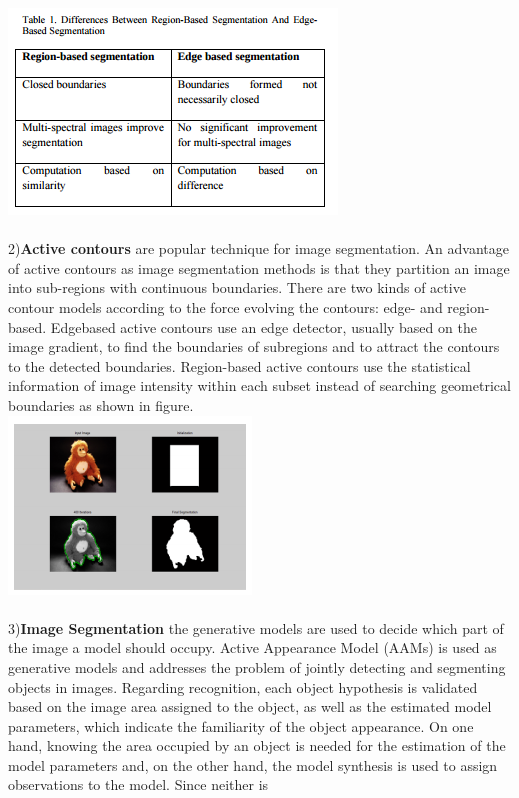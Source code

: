 \documentclass{article}
\begin{document}
\includegraphics[scale=.5]{2}\\\\
2)\textbf{Active contours} are popular technique for image
segmentation. An advantage of active contours as image
segmentation methods is that they partition an image into
sub-regions with continuous boundaries. There are two
kinds of active contour models according to the force
evolving the contours: edge- and region-based. Edgebased
active contours use an edge detector, usually based
on the image gradient, to find the boundaries of subregions
and to attract the contours to the detected
boundaries. Region-based active contours use the
statistical information of image intensity within each
subset instead of searching geometrical boundaries as
shown in figure. \\
\includegraphics[scale=.5]{3}\\\\
3)\textbf{Image Segmentation} the generative models are used
to decide which part of the image a model should occupy.
Active Appearance Model (AAMs) is used as generative
models and addresses the problem of jointly detecting and
segmenting objects in images. Regarding recognition,
each object hypothesis is validated based on the image
area assigned to the object, as well as the estimated model
parameters, which indicate the familiarity of the object
appearance. On one hand, knowing the area occupied by
an object is needed for the estimation of the model
parameters and, on the other hand, the model synthesis is
used to assign observations to the model. Since neither is
\end{document}
